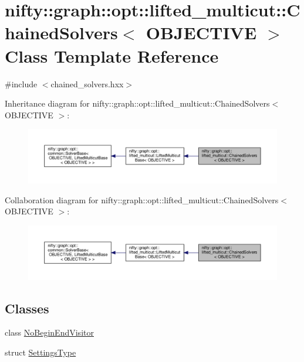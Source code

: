 \hypertarget{classnifty_1_1graph_1_1opt_1_1lifted__multicut_1_1ChainedSolvers}{}\section{nifty\+:\+:graph\+:\+:opt\+:\+:lifted\+\_\+multicut\+:\+:Chained\+Solvers$<$ O\+B\+J\+E\+C\+T\+I\+VE $>$ Class Template Reference}
\label{classnifty_1_1graph_1_1opt_1_1lifted__multicut_1_1ChainedSolvers}


{\ttfamily \#include $<$chained\+\_\+solvers.\+hxx$>$}



Inheritance diagram for nifty\+:\+:graph\+:\+:opt\+:\+:lifted\+\_\+multicut\+:\+:Chained\+Solvers$<$ O\+B\+J\+E\+C\+T\+I\+VE $>$\+:
\nopagebreak
\begin{figure}[H]
\begin{center}
\leavevmode
\includegraphics[width=350pt]{classnifty_1_1graph_1_1opt_1_1lifted__multicut_1_1ChainedSolvers__inherit__graph}
\end{center}
\end{figure}


Collaboration diagram for nifty\+:\+:graph\+:\+:opt\+:\+:lifted\+\_\+multicut\+:\+:Chained\+Solvers$<$ O\+B\+J\+E\+C\+T\+I\+VE $>$\+:
\nopagebreak
\begin{figure}[H]
\begin{center}
\leavevmode
\includegraphics[width=350pt]{classnifty_1_1graph_1_1opt_1_1lifted__multicut_1_1ChainedSolvers__coll__graph}
\end{center}
\end{figure}
\subsection*{Classes}
\begin{DoxyCompactItemize}
\item 
class \hyperlink{classnifty_1_1graph_1_1opt_1_1lifted__multicut_1_1ChainedSolvers_1_1NoBeginEndVisitor}{No\+Begin\+End\+Visitor}
\item 
struct \hyperlink{structnifty_1_1graph_1_1opt_1_1lifted__multicut_1_1ChainedSolvers_1_1SettingsType}{Settings\+Type}
\end{DoxyCompactItemize}
